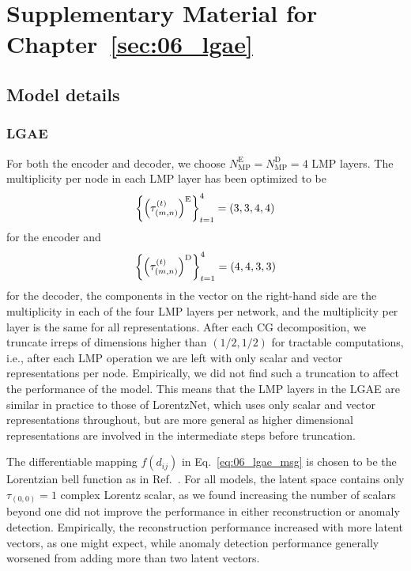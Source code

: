 \chapter{Supplementary Material for Chapter~\ref{sec:06_lgae}}
\label{app:06}

\section{Model details}
\label{app:06_lgae_hyperparams}

\subsection{LGAE}

For both the encoder and decoder, we choose $N_\mathrm{MP}^\mathrm{E} = N_\mathrm{MP}^\mathrm{D} = 4$ LMP layers.
The multiplicity per node in each LMP layer has been optimized to be
\begin{equation}
    \left\{ \left( \tau_{(m, n)}^{(t)} \right)^\mathrm{E} \right\}_{t=1}^{4} = (3,3,4,4)
\end{equation}
for the encoder and
\begin{equation}
    \left\{ \left( \tau_{(m, n)}^{(t)} \right)^\mathrm{D} \right\}_{t=1}^{4} = (4,4,3,3)
\end{equation}
for the decoder, the components in the vector on the right-hand side are the multiplicity in each of the four LMP layers per network, and the multiplicity per layer is the same for all representations.
After each CG decomposition, we truncate irreps of dimensions higher than $(1/2, 1/2)$ for tractable computations, i.e., after each LMP operation we are left with only scalar and vector representations per node.
Empirically, we did not find such a truncation to affect the performance of the model.
This means that the LMP layers in the LGAE are similar in practice to those of LorentzNet, which uses only scalar and vector representations throughout, but are more general as higher dimensional representations are involved in the intermediate steps before truncation.

The differentiable mapping $f(d_{ij})$ in Eq.~\ref{eq:06_lgae_msg} is chosen to be the Lorentzian bell function as in Ref.~\cite{bogatskiy2020lorentz}.
For all models, the latent space contains only $\tau_{(0,0)} = 1$ complex Lorentz scalar, as we found increasing the number of scalars beyond one did not improve the performance in either reconstruction or anomaly detection.
Empirically, the reconstruction performance increased with more latent vectors, as one might expect, while anomaly detection performance generally worsened from adding more than two latent vectors.

